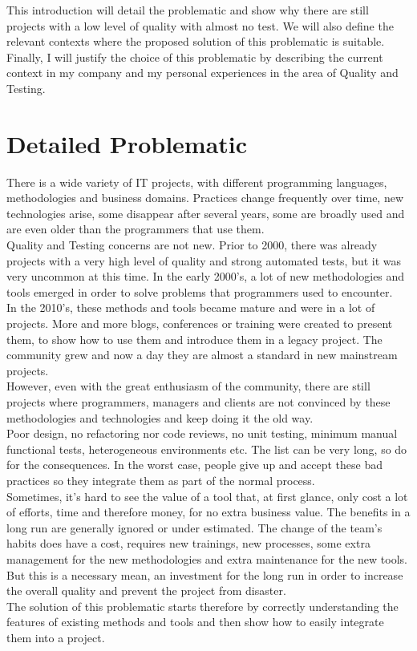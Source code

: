 This introduction will detail the problematic and show why there are
still projects with a low level of quality with almost no test.
We will also define the relevant contexts where the proposed solution
of this problematic is suitable.
Finally, I will justify the choice of this problematic by describing the
current context in my company and my personal experiences in the area of
Quality and Testing.
\section{Detailed Problematic}\label{sec:detailed-problematic}
There is a wide variety of IT projects, with different programming
languages, methodologies and business domains.
Practices change frequently over time, new technologies arise,
some disappear after several years, some are broadly used and are even older
than the programmers that use them. \\
Quality and Testing concerns are not new.
Prior to 2000, there was already projects with a very high level of quality
and strong automated tests, but it was very uncommon at this time.
In the early 2000's, a lot of new methodologies and tools emerged in order
to solve problems that programmers used to encounter. \\
In the 2010's, these methods and tools became mature and were in a
lot of projects.
More and more blogs, conferences or training were created to present them,
to show how to use them and introduce them in a legacy project.
The community grew and now a day they are almost a standard in new mainstream
projects. \\
\newline
However, even with the great enthusiasm of the community, there are still
projects where programmers, managers and clients are not convinced by
these methodologies and technologies and keep doing it the old way. \\
Poor design, no refactoring nor code reviews, no unit testing, minimum
manual functional tests, heterogeneous environments etc.
The list can be very long, so do for the consequences.
In the worst case, people give up and accept these bad practices so they
integrate them as part of the normal process. \\
Sometimes, it's hard to see the value of a tool that, at first glance, only
cost a lot of
efforts, time and therefore money, for no extra business value.
The benefits in a long run are generally ignored or under estimated.
The change of the team's habits does have a cost, requires new trainings,
new processes, some extra management for the new methodologies and
extra maintenance for the new tools.
But this is a necessary mean, an investment for the long run in order to
increase the overall quality and prevent the project from disaster. \\
\newline
The solution of this problematic starts therefore by correctly understanding
the features of existing methods and tools and then show how to easily
integrate them into a project.

